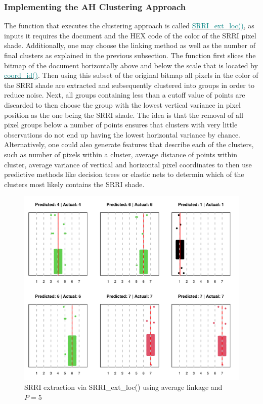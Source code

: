 \documentclass[aodsor,preprint]{imsart}
\numberwithin{equation}{section}
\theoremstyle{plain}
\begin{document}
\subsubsection{Implementing the AH Clustering Approach}
The function that executes the clustering approach is called \href{https://github.com/Base-R-Best-R/KID/blob/main/Code/Package/KIDs/R/SRRI_ext_loc.R}{\textcolor{teal}{SRRI\_ext\_loc()}}, as inputs it requires the document and the HEX code of the color of the SRRI pixel shade. Additionally, one may choose the linking method as well as the number of final clusters as explained in the previous subsection. The function first slices the bitmap of the document horizontally above and below the scale that is located by \href{https://github.com/Base-R-Best-R/KID/blob/main/Code/Package/KIDs/R/coord_id.R}{\textcolor{teal}{coord\_id()}}. Then using this subset of the original bitmap all pixels in the color of the SRRI shade are extracted and subsequently clustered into groups in order to reduce noise. Next, all groups containing less than a cutoff value of points are discarded to then choose the group with the lowest vertical variance in pixel position as the one being the SRRI shade. The idea is that the removal of all pixel groups below a number of points ensures that clusters with very little observations do not end up having the lowest horizontal variance by chance. Alternatively, one could also generate features that describe each of the clusters, such as number of pixels within a cluster, average distance of points within cluster, average variance of vertical and horizontal pixel coordinates to then use predictive methods like decision trees or elastic nets to determin which of the clusters most likely contains the SRRI shade.

\begin{figure}[H]
	\includegraphics[width = 12cm]{Ersteextr.pdf}
	\caption{SRRI extraction via SRRI\_ext\_loc() using average linkage and $P = 5$}
	\label{fig6}
\end{figure}
\end{document}

